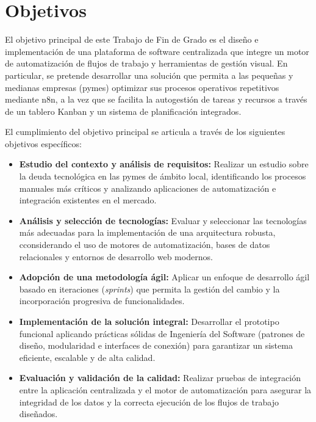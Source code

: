 \section{Objetivos}

El objetivo principal de este Trabajo de Fin de Grado es el diseño e implementación de una plataforma de software centralizada que integre un motor de automatización de flujos de trabajo y herramientas de gestión visual. En particular, se pretende desarrollar una solución que permita a las pequeñas y medianas empresas (pymes) optimizar sus procesos operativos repetitivos mediante n8n, a la vez que se facilita la autogestión de tareas y recursos a través de un tablero Kanban y un sistema de planificación integrados.

El cumplimiento del objetivo principal se articula a través de los siguientes objetivos específicos:

\begin{itemize}
    \item[\textbf{OBJ-1}] \textbf{Estudio del contexto y análisis de requisitos:} Realizar un estudio sobre la deuda tecnológica en las pymes de ámbito local, identificando los procesos manuales más críticos y analizando aplicaciones de automatización e integración existentes en el mercado.
    
    \item[\textbf{OBJ-2}] \textbf{Análisis y selección de tecnologías:} Evaluar y seleccionar las tecnologías más adecuadas para la implementación de una arquitectura robusta, cconsiderando el uso de motores de automatización, bases de datos relacionales y entornos de desarrollo web modernos.
    
    \item[\textbf{OBJ-3}] \textbf{Adopción de una metodología ágil:} Aplicar un enfoque de desarrollo ágil basado en iteraciones (\textit{sprints}) que permita la gestión del cambio y la incorporación progresiva de funcionalidades.
    
    \item[\textbf{OBJ-4}] \textbf{Implementación de la solución integral:} Desarrollar el prototipo funcional aplicando prácticas sólidas de Ingeniería del Software (patrones de diseño, modularidad e interfaces de conexión) para garantizar un sistema eficiente, escalable y de alta calidad.
    
    \item[\textbf{OBJ-5}] \textbf{Evaluación y validación de la calidad:} Realizar pruebas de integración entre la aplicación centralizada y el motor de automatización para asegurar la integridad de los datos y la correcta ejecución de los flujos de trabajo diseñados.
\end{itemize}

